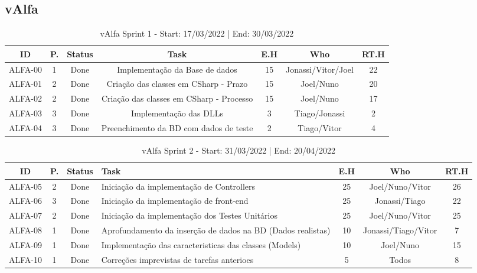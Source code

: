 \subsection{vAlfa}

\begin{table}[h]
    \centering
    \begin{tabular}{|c|c|c|c|c|c|c|}
        \hline
        ID & P. & Status & Task & E.H & Who & RT.H \\
        \hline                               %
        ALFA-00 & 1 & Done & Implementação da Base de dados & 15 & Jonassi/Vitor/Joel & 22 \\
        ALFA-01 & 2 & Done & Criação das classes em CSharp - Prazo & 15 & Joel/Nuno & 20 \\
        ALFA-02 & 2 & Done & Criação das classes em CSharp - Processo & 15 & Joel/Nuno & 17 \\
        ALFA-03 & 3 & Done & Implementação das DLLs & 3 & Tiago/Jonassi & 2 \\
        ALFA-04 & 3 & Done & Preenchimento da BD com dados de teste & 2 & Tiago/Vitor & 4 \\
        \hline 
    \end{tabular}
    \caption{vAlfa Sprint 1 - Start: 17/03/2022 | End: 30/03/2022}
\end{table}

\begin{table}[h]
    \centering
    \begin{tabular}{|c|c|c| m{18em} |c|c|c|}
        \hline
        ID & P. & Status & Task & E.H & Who & RT.H \\
        \hline                               %
        ALFA-05 & 2 & Done & Iniciação da implementação de Controllers & 25 & Joel/Nuno/Vitor & 26 \\
        ALFA-06 & 3 & Done & Iniciação da implementação de front-end & 25 & Jonassi/Tiago & 22 \\
        ALFA-07 & 2 & Done & Iniciação da implementação dos Testes Unitários & 25 & Joel/Nuno/Vitor & 25 \\
        ALFA-08 & 1 & Done & Aprofundamento da inserção de dados na BD (Dados realistas) & 10 & Jonassi/Tiago/Vitor & 7 \\
        ALFA-09 & 1 & Done & Implementação das caracteristicas das classes (Models) & 10 & Joel/Nuno & 15 \\
        ALFA-10 & 1 & Done & Correções imprevistas de tarefas anterioes & 5 & Todos & 8 \\
        \hline 
    \end{tabular}
    \caption{vAlfa Sprint 2 - Start: 31/03/2022 | End: 20/04/2022}
\end{table}

